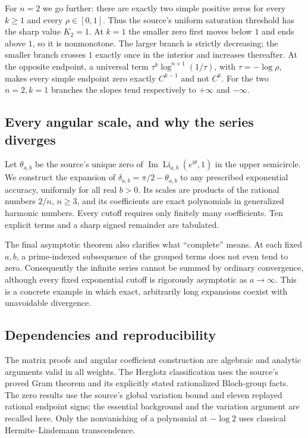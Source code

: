 \documentclass[11pt,a4paper]{article}
\theoremstyle{definition}
\theoremstyle{remark}
\numberwithin{equation}{section}
\DeclareMathOperator{\Li}{Li}
\DeclareMathOperator{\Imag}{Im}
\newcommand{\ii}{\mathrm i}
\begin{document}
For $n=2$ we go further: there are exactly two simple positive zeros
for every $k\geq1$ and every $\rho\in[0,1]$. Thus the source's uniform
saturation threshold has the sharp value $K_2=1$. At $k=1$ the smaller
zero first moves below $1$ and ends above $1$, so it is nonmonotone.
The larger branch is strictly decreasing; the smaller branch crosses
$1$ exactly once in the interior and increases thereafter.
At the opposite endpoint, a universal term
$\tau^k\log^{n+1}(1/\tau)$, with $\tau=-\log\rho$, makes every simple
endpoint zero exactly $C^{k-1}$ and not $C^k$. For the two $n=2,k=1$
branches the slopes tend respectively to $+\infty$ and $-\infty$.

\subsection{Every angular scale, and why the series diverges}

Let $\theta_{a,b}$ be the source's unique zero of
$\Imag\Li_{a,b}(e^{\ii\theta},1)$ in the upper semicircle. We construct
the expansion of $\delta_{a,b}=\pi/2-\theta_{a,b}$ to any prescribed
exponential accuracy, uniformly for all real $b>0$. Its scales are
products of the rational numbers $2/n$, $n\geq3$, and its coefficients
are exact polynomials in generalized harmonic numbers. Every cutoff
requires only finitely many coefficients. Ten explicit terms and a
sharp signed remainder are tabulated.

The final asymptotic theorem also clarifies what ``complete'' means.
At each fixed $a,b$, a prime-indexed subsequence of the grouped terms
does not even tend to zero. Consequently the infinite series cannot
be summed by ordinary convergence, although every fixed exponential
cutoff is rigorously asymptotic as $a\to\infty$. This is a concrete
example in which exact, arbitrarily long expansions coexist with
unavoidable divergence.

\subsection{Dependencies and reproducibility}

The matrix proofs and angular coefficient construction are algebraic
and analytic arguments valid in all weights. The Herglotz classification
uses the source's proved Gram theorem and its explicitly stated
rationalized Bloch-group facts. The zero results use the source's
global variation bound and eleven replayed rational endpoint signs;
the essential background and the variation argument are recalled here.
Only the nonvanishing of a polynomial at $-\log2$ uses classical
Hermite--Lindemann transcendence.
\end{document}
